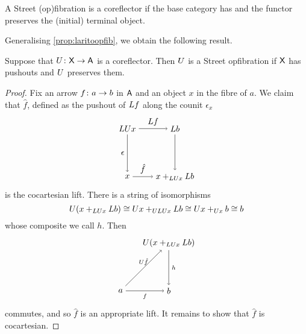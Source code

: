 \documentclass{amsart}
\begin{document}
\begin{cor}
  A Street (op)fibration is a coreflector if the base
  category has and the functor preserves the (initial)
  terminal object.
\end{cor}

Generalising \cref{prop:laritoopfib}, we obtain the following result.

\begin{prop}
  \label{thm:corefl-to-street-opfib}
  Suppose that $ U \colon \mathsf{X} \to \mathsf{A} $ is a
  coreflector. Then $ U $ is a Street opfibration
  if $ \mathsf{X} $ has pushouts and $ U $ preserves them.
\end{prop}

\begin{proof}
  Fix an arrow $ f \colon a \to b $ in $ \mathsf{A} $
  and an object $ x $ in the fibre of $ a $. We
  claim that $ \hat{f} $, defined as the pushout
  of $ L f $
  along the counit $ \epsilon_x $
  \[
    \begin{tikzpicture}
      \node (ul) at (0,2) {$ \L \U x $};
      \node (ll) at (0,0) {$ x $};
      \node (ur) at (2,2) {$ \L b $};
      \node (lr) at (2,0) {$ x +_{\L\U x} \L b$};
      \draw [->] (ul) to node [left] {$ \epsilon $} (ll);
      \draw [->] (ul) to node [above] {$ \L f $} (ur);
      \draw [->] (ll) to node [above] {$ \hat{f} $} (lr);
      \draw [->] (ur) to (lr);
    \end{tikzpicture}
  \]
  is the cocartesian lift. There is a string of
  isomorphisms
  \[
    U ( x +_{LU x} L b ) \cong
    U x +_{ULU x} L b \cong
    U x +_{U x} b \cong
    b
  \]
  whose composite we call $ h $.  Then
  \[
    \begin{tikzpicture}
      \node (a) at (0,0) {$ a $};
      \node (b) at (2,0) {$ b $};
      \node (c) at (2,2) {$ \U ( x+_{\L\U x} \L b ) $};
      \path[->,font=\scriptsize]
      (a) edge node[below]{$ f $} (b)
      (a) edge node[above]{$ \U\hat{f} $} (c)
      (c) edge node[right]{$ h $} (b);
    \end{tikzpicture}
  \]
  commutes, and so $ \hat{f} $ is an appropriate
  lift. It remains to show that $ \hat{f} $ is
  cocartesian.


\end{proof}
\end{document}
